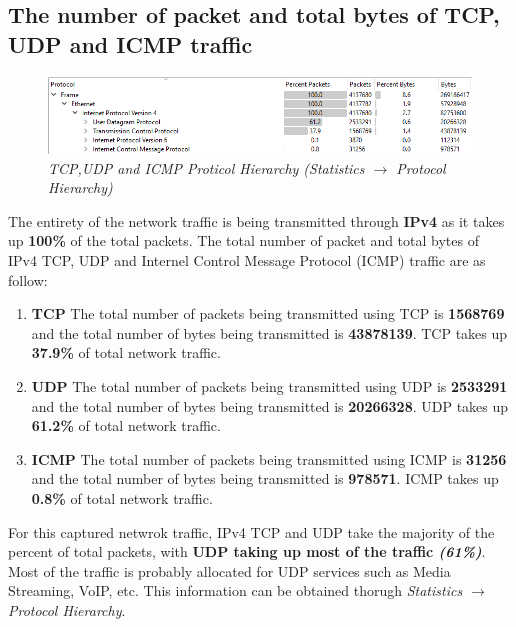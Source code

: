 \documentclass[a4paper,11pt]{article}
\begin{document}
\subsection{The number of packet and total bytes of TCP, UDP and ICMP traffic }
\begin{figure}[h!]
	\includegraphics[width = 16cm]{Traffic}
	\caption{\textit{TCP,UDP and ICMP Proticol Hierarchy (Statistics $\rightarrow$ Protocol Hierarchy)}}
\end{figure}
The entirety of the network traffic is being transmitted through \textbf{IPv4} as it takes up \textbf{100\%} of the total packets.
The total number of packet and total bytes of IPv4 TCP, UDP and Internel Control Message Protocol (ICMP) traffic are as follow:
\begin{enumerate}
	\item \textbf{TCP}
	\newline
	The total number of packets being transmitted using TCP is \textbf{1568769} and  the total number of bytes being transmitted is \textbf{43878139}.
	TCP takes up \textbf{37.9\%} of total network traffic.
	\item \textbf{UDP}
	\newline
	The total number of packets being transmitted using UDP is \textbf{2533291} and  the total number of bytes being transmitted is \textbf{20266328}. 	
	UDP takes up \textbf{61.2\%} of total network traffic.
	\item \textbf{ICMP}
	\newline
	The total number of packets being transmitted using ICMP is \textbf{31256} and  the total number of bytes being transmitted is \textbf{978571}. 	
	ICMP takes up \textbf{0.8\%} of total network traffic.
\end{enumerate}
For this captured netwrok traffic, IPv4 TCP and UDP take the majority of the percent of total packets, with \textbf{UDP taking up most of the traffic \textit{(61\%)}}. Most of the traffic is probably allocated for UDP services such as Media Streaming, VoIP, etc.
This information can be obtained thorugh \textit{Statistics $\rightarrow$ Protocol Hierarchy}.
\end{document}
